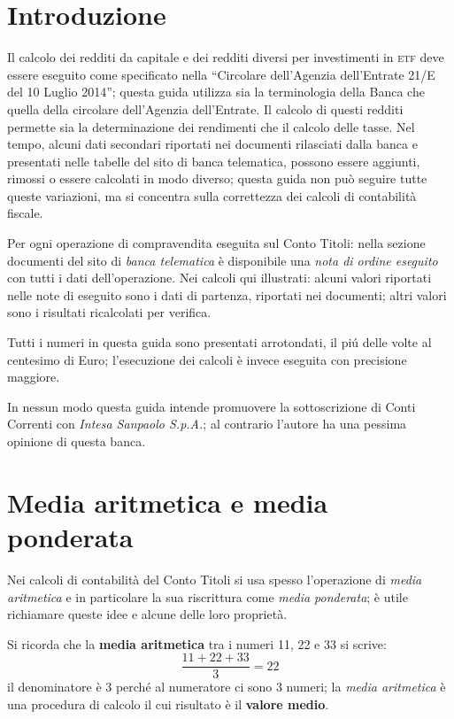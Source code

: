 \documentclass[12pt,a4paper]{article}
\newcommand{\IntesaSanpaolo}[0]{\emph{Intesa Sanpaolo S.p.A.}}
\newcommand{\Etf}[1]{\textsc{etf}}
\begin{document}
\tableofcontents


\section{Introduzione}


Il calcolo  dei redditi da  capitale e dei  redditi diversi per  investimenti in \Etf{}  deve essere
eseguito come  specificato nella ``Circolare  dell'Agenzia dell'Entrate  21/E del 10  Luglio 2014'';
questa  guida utilizza  sia la  terminologia  della Banca  che quella  della circolare  dell'Agenzia
dell'Entrate.  Il  calcolo di questi  redditi permette sia la  determinazione dei rendimenti  che il
calcolo delle  tasse.  Nel  tempo, alcuni  dati secondari riportati  nei documenti  rilasciati dalla
banca e presentati  nelle tabelle del sito  di banca telematica, possono essere  aggiunti, rimossi o
essere  calcolati in  modo diverso;  questa guida  non può  seguire tutte  queste variazioni,  ma si
concentra sulla correttezza dei calcoli di contabilità fiscale.

Per ogni operazione di compravendita eseguita sul  Conto Titoli: nella sezione documenti del sito di
\emph{banca  telematica}  è  disponibile  una  \emph{nota  di ordine  eseguito}  con  tutti  i  dati
dell'operazione.  Nei calcoli qui illustrati: alcuni valori  riportati nelle note di eseguito sono i
dati di partenza, riportati nei documenti; altri valori sono i risultati ricalcolati per verifica.

Tutti i numeri in questa guida sono presentati arrotondati, il piú delle volte al centesimo di Euro;
l'esecuzione dei calcoli è invece eseguita con precisione maggiore.

In  nessun  modo   questa  guida  intende  promuovere  la  sottoscrizione   di  Conti  Correnti  con
\IntesaSanpaolo{}; al contrario l'autore ha una pessima opinione di questa banca.


\section{Media aritmetica e media ponderata}


Nei calcoli di contabilità del Conto Titoli  si usa spesso l'operazione di \emph{media aritmetica} e
in particolare  la sua  riscrittura come \emph{media  ponderata}; è utile  richiamare queste  idee e
alcune delle loro proprietà.

Si ricorda che la \textbf{media aritmetica} tra i numeri \num{11}, \num{22} e \num{33} si scrive:
\begin{equation*}
  \frac{\num{11} + \num{22} + \num{33}}{3} = \num{22}
\end{equation*}
il denominatore è \num{3} perché al numeratore  ci sono \num{3} numeri; la \emph{media aritmetica} è
una procedura di calcolo il cui risultato è il \textbf{valore medio}.
\end{document}
